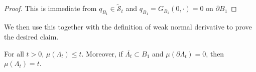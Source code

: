 \documentclass[12pt]{amsart}
\numberwithin{equation}{section}
\newcommand{\mclSshift}[2]{\hyperref[eq:shifted-supersolutions]{\mathcal{\tilde{S}}^{#1}_{#2}}}
\newcommand{\lssshift}[2]{\hyperref[eq:appendix-least-supersolution]{\tilde{w}^{#1}_{#2}}}
\newcommand{\cluster}[2]{\hyperref[eq:non-co-set]{\mathit{\Lambda}^{#1}_{#2}}}
\newcommand{\odometer}[2]{\hyperref[eq:limit-odometer]{v^{#1}_{#2}}}
\begin{document}
	\begin{proof}
		This is immediate from $q_{B_1} \in  \mclSshift{}{t}$ and $q_{B_1} = G_{B_1}(0,\cdot) = 0$ on $\partial B_1$
	\end{proof}
	
	
	We then use this together with the definition of weak normal derivative to prove the desired claim. 
	\begin{lemma} \label{lemma:appendix-conservation-of-mass}
		For all $t > 0$, $\mu({\cluster{}{t}}) \leq t$. Moreover, if $\overline{{{\cluster{}{t}}}} \subset B_1$ and $\mu(\partial {\cluster{}{t}}) = 0$, then $\mu({\cluster{}{t}}) = t$.
	\end{lemma}
	
	
	
\end{document}

